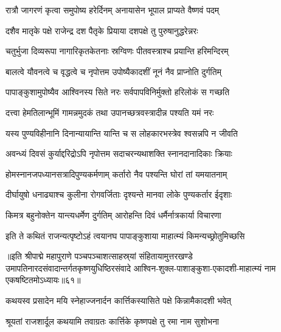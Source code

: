 \twolineshloka
{रात्रौ जागरणं कृत्वा समुपोष्य हरेर्दिनम्}
{अनायासेन भूपाल प्राप्यते वैष्णवं पदम्}%

\twolineshloka
{दशैव मातृके पक्षे राजेन्द्र दश पैतृके}
{प्रियाया दशपक्षे तु पुरुषानुद्धरेन्नरः}%

\twolineshloka
{चतुर्भुजा दिव्यरूपा नागारिकृतकेतनाः}
{स्रग्विणः पीतवस्त्राश्च प्रयान्ति हरिमन्दिरम्}%

\twolineshloka
{बालत्वे यौवनत्वे च वृद्धत्वे च नृपोत्तम}
{उपोष्यैकादशीं नूनं नैव प्राप्नोति दुर्गतिम्}%

\twolineshloka
{पापाङ्कुशामुपोष्यैव आश्विनस्य सिते नरः}
{सर्वपापविनिर्मुक्तो हरिलोकं स गच्छति}%

\twolineshloka
{दत्त्वा हेमतिलान्भूमिं गामन्नमुदकं तथा}
{उपानच्छत्रवस्त्रादीन्न पश्यति यमं नरः}%

\twolineshloka
{यस्य पुण्यविहीनानि दिनान्यायान्ति यान्ति च}
{स लोहकारभस्त्रेव श्वसन्नपि न जीवति}%

\twolineshloka
{अवन्ध्यं दिवसं कुर्याद्दरिद्रोऽपि नृपोत्तम}
{सदाचरन्यथाशक्ति स्नानदानादिकाः क्रियाः}%

\twolineshloka
{होमस्नानजपध्यानसत्रादिपुण्यकर्मणाम्}
{कर्तारो नैव पश्यन्ति घोरां तां यमयातनाम्}%

\twolineshloka
{दीर्घायुषो धनाढ्याश्च कुलीना रोगवर्जिताः}
{दृश्यन्ते मानवा लोके पुण्यकर्तार ईदृशाः}%

\twolineshloka
{किमत्र बहुनोक्तेन यान्त्यधर्मेण दुर्गतिम्}
{आरोहन्ति दिवं धर्मैर्नात्रकार्या विचारणा}%

\twolineshloka
{इति ते कथितं राजन्यत्पृष्टोऽहं त्वयानघ}
{पापाङ्कुशाया माहात्म्यं किमन्यच्छ्रोतुमिच्छसि}%

॥इति श्रीपाद्मे महापुराणे पञ्चपञ्चाशत्साहस्र्यां संहितायामुत्तरखण्डे उमापतिनारदसंवादान्तर्गतकृष्णयुधिष्ठिरसंवादे आश्विन-शुक्ल-पाशाङ्कुशा-एकादशी-माहात्म्यं नाम एकषष्टितमोऽध्यायः॥६१॥


\hyperref[sec:ekadashi_mahatmyam_padma_puranam]{\closesub}
\clearpage

\label{sec:padma-karttika-krishna-rama}



\twolineshloka
{कथयस्व प्रसादेन मयि स्नेहाज्जनार्दन}
{कार्त्तिकस्यासिते पक्षे किन्नामैकादशी भवेत्}%


\twolineshloka
{श्रूयतां राजशार्दूल कथयामि तवाग्रतः}
{कार्त्तिके कृष्णपक्षे तु रमा नाम सुशोभना}%

